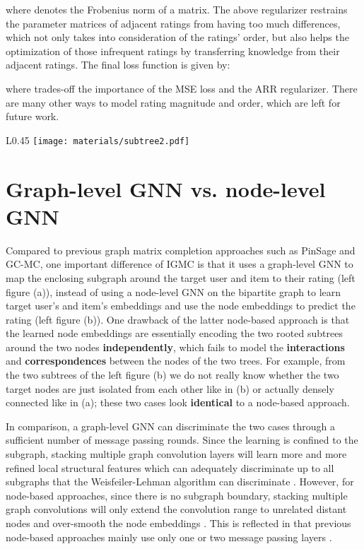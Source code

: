 \documentclass{article} \usepackage{iclr2020_conference,times}
\begin{document}
where  denotes the Frobenius norm of a matrix. The above regularizer restrains the parameter matrices of adjacent ratings from having too much differences, which not only takes into consideration of the ratings' order, but also helps the optimization of those infrequent ratings by transferring knowledge from their adjacent ratings. The final loss function is given by:

where  trades-off the importance of the MSE loss and the ARR regularizer. There are many other ways to model rating magnitude and order, which are left for future work.


\begin{wrapfigure}[11]{L}{0.45\textwidth}
\centering
\vspace{-12pt}
  \texttt{[image: materials/subtree2.pdf]}
\label{subtree}
\end{wrapfigure}

\section{Graph-level GNN vs. node-level GNN}
\label{subgraphVSsubtree}



Compared to previous graph matrix completion approaches such as PinSage and GC-MC, one important difference of IGMC is that it uses a graph-level GNN to map the enclosing subgraph around the target user and item to their rating (left figure (a)), instead of using a node-level GNN on the bipartite graph  to learn target user's and item's embeddings and use the node embeddings to predict the rating (left figure (b)). 
One drawback of the latter node-based approach is that the learned node embeddings are essentially encoding the two rooted subtrees around the two nodes \textbf{independently}, which fails to model the \textbf{interactions} and \textbf{correspondences} between the nodes of the two trees. For example, from the two subtrees of the left figure (b) we do not really know whether the two target nodes are just isolated from each other like in (b) or actually densely connected like in (a); these two cases look \textbf{identical} to a node-based approach. 

In comparison, a graph-level GNN can discriminate the two cases through a sufficient number of message passing rounds. Since the learning is confined to the subgraph, stacking multiple graph convolution layers will learn more and more refined local structural features which can adequately discriminate up to all subgraphs that the Weisfeiler-Lehman algorithm can discriminate \citep{xu2018powerful}. However, for node-based approaches, since there is no subgraph boundary, stacking multiple graph convolutions will only extend the convolution range to unrelated distant nodes and over-smooth the node embeddings \citep{li2018deeper}. This is reflected in that previous node-based approaches mainly use only one or two message passing layers \citep{berg2017graph,ying2018graph}.
\end{document}
